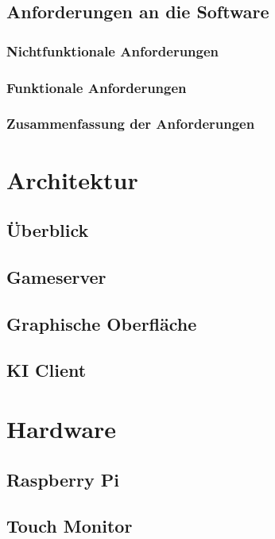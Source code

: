 \documentclass[12pt,a4paper,bibliography=totocnumbered,listof=totocnumbered]{article}
\begin{document}
\subsection{Anforderungen an die Software}
\subsubsection{Nichtfunktionale Anforderungen}
\subsubsection{Funktionale Anforderungen}
\subsubsection{Zusammenfassung der Anforderungen}

\pagebreak

\section{Architektur}
\subsection{Überblick}
\subsection{Gameserver}
\subsection{Graphische Oberfläche}
\subsection{KI Client}

\section{Hardware}
\subsection{Raspberry Pi}
\subsection{Touch Monitor}
\end{document}

